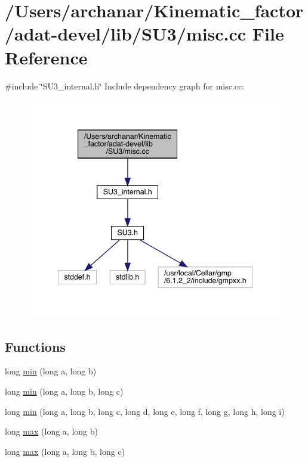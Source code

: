 \hypertarget{adat-devel_2lib_2SU3_2misc_8cc}{}\section{/\+Users/archanar/\+Kinematic\+\_\+factor/adat-\/devel/lib/\+S\+U3/misc.cc File Reference}
\label{adat-devel_2lib_2SU3_2misc_8cc}
{\ttfamily \#include \char`\"{}S\+U3\+\_\+internal.\+h\char`\"{}}\newline
Include dependency graph for misc.\+cc\+:
\nopagebreak
\begin{figure}[H]
\begin{center}
\leavevmode
\includegraphics[width=342pt]{d0/d40/adat-devel_2lib_2SU3_2misc_8cc__incl}
\end{center}
\end{figure}
\subsection*{Functions}
\begin{DoxyCompactItemize}
\item 
long \mbox{\hyperlink{adat-devel_2lib_2SU3_2misc_8cc_a04a42f8bdb11b05ec4a03a191b426081}{min}} (long a, long b)
\item 
long \mbox{\hyperlink{adat-devel_2lib_2SU3_2misc_8cc_aefc0eafc9721ef9630421dcc1358b8e9}{min}} (long a, long b, long c)
\item 
long \mbox{\hyperlink{adat-devel_2lib_2SU3_2misc_8cc_a7b867e861e5689e3621835875d963e2d}{min}} (long a, long b, long c, long d, long e, long f, long g, long h, long i)
\item 
long \mbox{\hyperlink{adat-devel_2lib_2SU3_2misc_8cc_a9881a990a03d466ac29ae1fb645fe1a4}{max}} (long a, long b)
\item 
long \mbox{\hyperlink{adat-devel_2lib_2SU3_2misc_8cc_a6e0243083ac83960d744961a5aa26f8d}{max}} (long a, long b, long c)
\end{DoxyCompactItemize}


